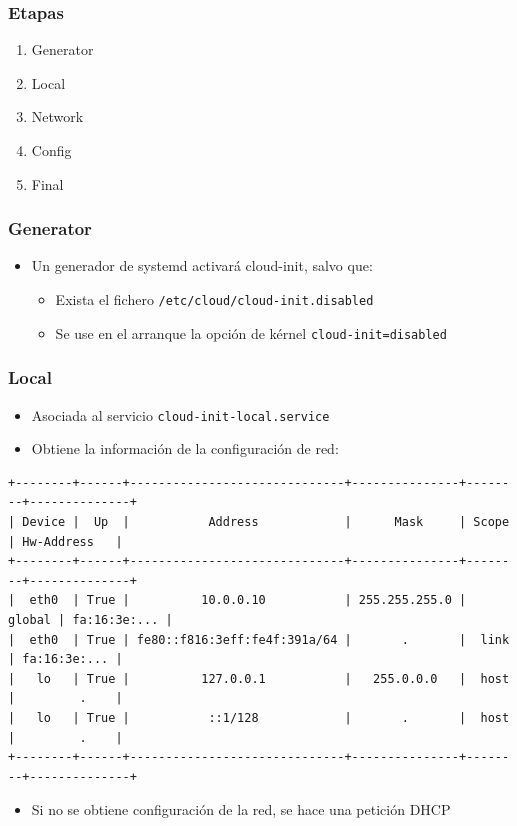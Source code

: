 \documentclass{beamer}
\begin{document}
\begin{frame}
  \frametitle{Etapas}
  \begin{enumerate}
  \item Generator
  \item Local
  \item Network
  \item Config
  \item Final
  \end{enumerate}
\end{frame}

\begin{frame}
  \frametitle{Generator}
  \begin{itemize}
  \item Un generador de systemd activará cloud-init, salvo que:
    \begin{itemize}
    \item Exista el fichero \texttt{/etc/cloud/cloud-init.disabled}
    \item Se use en el arranque la opción de kérnel \texttt{cloud-init=disabled}
    \end{itemize}
  \end{itemize}
\end{frame}

\begin{frame}[fragile]
  \frametitle{Local}
  \begin{itemize}
  \item Asociada al servicio \texttt{cloud-init-local.service}
  \item Obtiene la información de la configuración de red:
  \end{itemize}
  \begin{lstlisting}
+--------+------+------------------------------+---------------+--------+--------------+
| Device |  Up  |           Address            |      Mask     | Scope  | Hw-Address   |
+--------+------+------------------------------+---------------+--------+--------------+
|  eth0  | True |          10.0.0.10           | 255.255.255.0 | global | fa:16:3e:... |
|  eth0  | True | fe80::f816:3eff:fe4f:391a/64 |       .       |  link  | fa:16:3e:... |
|   lo   | True |          127.0.0.1           |   255.0.0.0   |  host  |         .    |
|   lo   | True |           ::1/128            |       .       |  host  |         .    |
+--------+------+------------------------------+---------------+--------+--------------+
\end{lstlisting}
\begin{itemize}
\item Si no se obtiene configuración de la red, se hace una petición DHCP
\end{itemize}
\end{frame}
\end{document}
